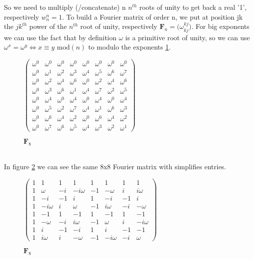 \documentclass[oneside]{thesisclass}
\begin{document}
So we need to multiply (/concatenate) n $n^{th}$ roots of unity to get back a real '1', respectively $w_n^n = 1$.
To build a Fourier matrix of order n, we put at position jk the $jk^{th}$ power of the $n^{th}$ root of unity, respectively $\mathbf F_n = \Big( \omega _{kj}^{kj}\Big)$.
For big exponents we can use the fact that by definition $\omega$ is a primitive root of unity, so we can use $\omega ^{x} = \omega ^{y} \iff x \equiv y \text{ mod}(n)$ to modulo the exponents \ref{fMod}.
\begin{figure}
 \begin{center}
  $
  \begin{pmatrix}
    \omega ^0 & \omega ^0 & \omega ^0 & \omega ^0 & \omega ^0 & \omega ^0 & \omega ^0 & \omega ^0 \\
    \omega ^0 & \omega ^1 & \omega ^2 & \omega ^3 & \omega ^4 & \omega ^5 & \omega ^6 & \omega ^7 \\
    \omega ^0 & \omega ^2 & \omega ^4 & \omega ^6 & \omega ^0 & \omega ^{2} & \omega ^{4} & \omega ^{6} \\
    \omega ^0 & \omega ^3 & \omega ^6 & \omega ^1 & \omega ^{4} & \omega ^{7} & \omega ^{2} & \omega ^{5} \\
    \omega ^0 & \omega ^4 & \omega ^0 & \omega ^{4} & \omega ^{0} & \omega ^{4} & \omega ^{0} & \omega ^{4} \\
    \omega ^0 & \omega ^5 & \omega ^{2} & \omega ^{7} & \omega ^{4} & \omega ^{1} & \omega ^{6} & \omega ^{3} \\
    \omega ^0 & \omega ^6 & \omega ^{4} & \omega ^{2} & \omega ^{0} & \omega ^{6} & \omega ^{4} & \omega ^{2} \\
    \omega ^0 & \omega ^7 & \omega ^{6} & \omega ^{5} & \omega ^{4} & \omega ^{3} & \omega ^{2} & \omega ^{1} 
  \end{pmatrix}
  $
  \caption{$\mathbf F_8$}
  \label{fMod}
 \end{center}
\end{figure}
\\In figure \ref{f8} we can see the same 8x8 Fourier matrix with simplifies entries.
\begin{figure}
 \begin{center}
  $
  \begin{pmatrix}
    1 & 1 & 1 & 1 & 1 & 1 & 1 & 1 \\
    1 & \omega & -i & -i\omega & -1 & -\omega & i & i\omega \\
    1 & -i & -1 & i & 1 & -i & -1 & i \\
    1 & -i\omega & i & \omega & -1 & i\omega & -i & -\omega \\
    1 & -1 & 1 & -1 & 1 & -1 & 1 & -1 \\
    1 & -\omega & -i & i\omega & -1 & \omega & i & -i\omega \\
    1 & i & -1 & -i & 1 & i & -1 & -1 \\
    1 & i\omega & i & -\omega & -1 & -i\omega & -i & \omega     
  \end{pmatrix}
  $
  \caption{$\mathbf F_8$}
  \label{f8}
 \end{center}
\end{figure}
\end{document}
